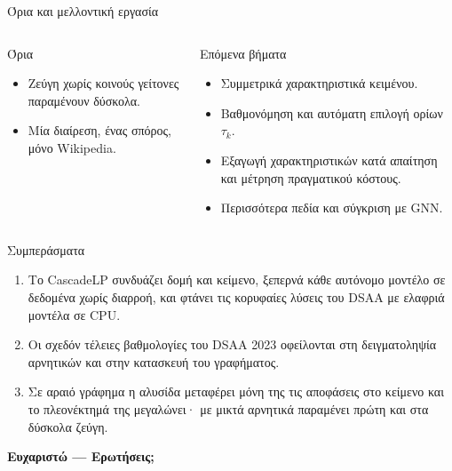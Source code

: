 \documentclass[11pt,aspectratio=169]{beamer}
\newcommand{\en}[1]{\foreignlanguage{english}{#1}}
\begin{document}
\begin{frame}{Όρια και μελλοντική εργασία}
  \begin{columns}[T,onlytextwidth]
      \begin{block}{Όρια}
        \begin{itemize}
          \item Ζεύγη χωρίς κοινούς γείτονες παραμένουν δύσκολα.
          \item Μία διαίρεση, ένας σπόρος, μόνο \en{Wikipedia}.
        \end{itemize}
      \end{block}
      \begin{block}{Επόμενα βήματα}
        \begin{itemize}
          \item Συμμετρικά χαρακτηριστικά κειμένου.
          \item Βαθμονόμηση και αυτόματη επιλογή ορίων $\tau_k$.
          \item Εξαγωγή χαρακτηριστικών κατά απαίτηση και μέτρηση
            πραγματικού κόστους.
          \item Περισσότερα πεδία και σύγκριση με \en{GNN}.
        \end{itemize}
      \end{block}
  \end{columns}
\end{frame}

\begin{frame}{Συμπεράσματα}
  \vspace{0.3cm}
  \begin{enumerate}
    \setlength{\itemsep}{0.55cm}
    \item Το \en{CascadeLP} συνδυάζει δομή και κείμενο, ξεπερνά κάθε
      αυτόνομο μοντέλο σε δεδομένα χωρίς διαρροή, και φτάνει τις κορυφαίες
      λύσεις του \en{DSAA} με ελαφριά μοντέλα σε \en{CPU}.
    \item Οι σχεδόν τέλειες βαθμολογίες του \en{DSAA 2023} οφείλονται στη
      δειγματοληψία αρνητικών και στην κατασκευή του γραφήματος.
    \item Σε αραιό γράφημα η αλυσίδα μεταφέρει μόνη της τις αποφάσεις στο
      κείμενο και το πλεονέκτημά της μεγαλώνει· με μικτά αρνητικά παραμένει
      πρώτη και στα δύσκολα ζεύγη.
  \end{enumerate}
  \vspace{0.6cm}
  \begin{center}
    {\Large\color{Teal}\textbf{Ευχαριστώ — Ερωτήσεις;}}
  \end{center}
\end{frame}
\end{document}
